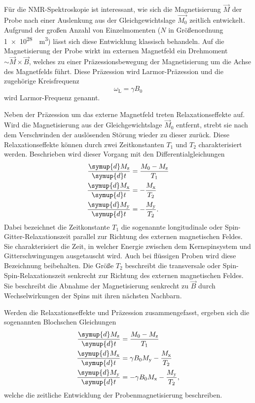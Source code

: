 Für die NMR-Spektroskopie ist interessant, wie sich die Magnetisierung $\vec{M}$
der Probe nach einer Auslenkung aus der Gleichgewichtslage $\vec{M_0}$
zeitlich entwickelt.
Aufgrund der großen Anzahl von Einzelmomenten
($N$ in Größenordnung \SI[retain-unity-mantissa=false]{1e28}{\per\cubic\meter})
lässt sich diese Entwicklung klassisch behandeln.
Auf die Magnetisierung der Probe wirkt im externen Magnetfeld ein Drehmoment
$\sim \vec{M} \times \vec{B}$,
welches zu einer Präzessionsbewegung der Magnetisierung um die Achse des
Magnetfelds führt.
Diese Präzession wird Larmor-Präzession und die zugehörige Kreisfrequenz
\begin{equation}
  \omega_\text{L} = \gamma B_0
  \label{eqn:LarmorFrequenz}
\end{equation}
wird Larmor-Frequenz genannt.

Neben der Präzession um das externe Magnetfeld treten Relaxationseffekte auf.
Wird die Magnetisierung aus der Gleichgewichtslage $\vec{M}_0$ entfernt,
strebt sie nach dem Verschwinden der auslösenden Störung wieder zu dieser zurück.
Diese Relaxationseffekte können durch zwei Zeitkonstanten $T_1$ und
$T_2$ charakterisiert werden.
Beschrieben wird dieser Vorgang mit den Differentialgleichungen
\begin{align*}
 \frac{\symup{d} M_\text{z}}{\symup{d} t} &= \frac{M_0 - M_\text{z}}{T_1} \\
 \frac{\symup{d} M_\text{x}}{\symup{d} t} &= -\frac{M_\text{x}}{T_2} \\
 \frac{\symup{d} M_\text{y}}{\symup{d} t} &= -\frac{M_\text{y}}{T_2}.
\end{align*}
Dabei bezeichnet die Zeitkonstante $T_1$ die sogenannte longitudinale oder
Spin-Gitter-Relaxationszeit parallel zur Richtung des externen magnetischen Feldes.
Sie charakterisiert die Zeit, in welcher Energie zwischen dem Kernspinsystem
und Gitterschwingungen ausgetauscht wird. Auch bei flüssigen Proben wird
diese Bezeichnung beibehalten.
Die Größe $T_2$ beschreibt die transversale oder Spin-Spin-Relaxationszeit
senkrecht zur Richtung des externen magnetischen Feldes.
Sie beschreibt die Abnahme der Magnetisierung senkrecht zu $\vec{B}$
durch Wechselwirkungen der Spins mit ihren nächsten Nachbarn.

Werden die Relaxationseffekte und Präzession zusammengefasst, ergeben sich
die sogenannten Blochschen Gleichungen
\begin{equation}
  \begin{split}
    \frac{\symup{d} M_\text{z}}{\symup{d} t} &= \frac{M_0 - M_\text{z}}{T_1} \\
    \frac{\symup{d} M_\text{x}}{\symup{d} t} &= 
      \gamma B_0 M_\text{y} - \frac{M_\text{x}}{T_2} \\
    \frac{\symup{d} M_\text{y}}{\symup{d} t} &=
      - \gamma B_0 M_\text{x} - \frac{M_\text{y}}{T_2},
  \end{split}
  \label{eqn:Bloch-Gleichungen}
\end{equation}
welche die zeitliche Entwicklung der Probenmagnetisierung beschreiben.


